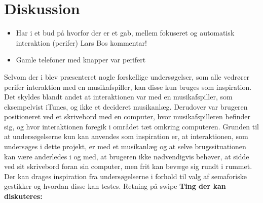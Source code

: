 \chapter{Diskussion}
\label{Samlet Diskussion}
%
\begin{itemize}
  \item Har i et bud på hvorfor der er et gab, mellem fokuseret og automatisk interaktion (perifer) Lars Bos kommentar!
  \item Gamle telefoner med knapper var perifert
\end{itemize}
%
Selvom der i  blev præsenteret nogle forskellige undersøgelser, som alle vedrører perifer interaktion med en musikafspiller, kan disse kun bruges som inspiration. Det skyldes blandt andet at interaktionen var med en musikafspiller, som eksempelvist iTunes, og ikke et decideret musikanlæg. Derudover var brugeren positioneret ved et skrivebord med en computer, hvor musikafspilleren befinder sig, og hvor interaktionen foregik i området tæt omkring computeren. Grunden til at undersøgelserne kun kan anvendes som inspiration er, at interaktionen, som undersøges i dette projekt, er med et musikanlæg og at selve brugssituationen kan være anderledes i og med, at brugeren ikke nødvendigvis behøver, at sidde ved sit skrivebord foran sin computer, men frit kan bevæge sig rundt i rummet. Der kan drages inspiration fra undersøgelserne i forhold til valg af semaforiske gestikker og hvordan disse kan testes.\blankline
%
Retning på swipe\blankline
%
\textbf{Ting der kan diskuteres:}
